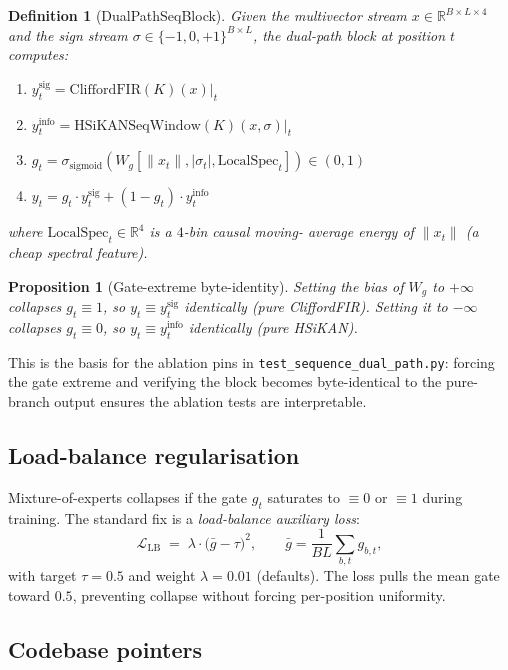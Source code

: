 \documentclass[11pt,a4paper]{article}
\newtheorem{definition}[theorem]{Definition}
\newtheorem{proposition}[theorem]{Proposition}
\theoremstyle{remark}
\newcommand{\R}{\mathbb{R}}
\begin{document}
\begin{definition}[DualPathSeqBlock]
Given the multivector stream $x \in \R^{B \times L \times 4}$ and
the sign stream $\sigma \in \{-1, 0, +1\}^{B \times L}$, the
dual-path block at position $t$ computes:
\begin{enumerate}[label=(\arabic*)]
\item $y_t^{\text{sig}} = \mathrm{CliffordFIR}(K)(x)|_t$
\item $y_t^{\text{info}} = \mathrm{HSiKANSeqWindow}(K)(x, \sigma)|_t$
\item $g_t = \sigma_{\text{sigmoid}}\!\left(W_g [\|x_t\|, |\sigma_t|, \text{LocalSpec}_t]\right) \in (0, 1)$
\item $y_t = g_t \cdot y_t^{\text{sig}} + (1 - g_t) \cdot y_t^{\text{info}}$
\end{enumerate}
where $\mathrm{LocalSpec}_t \in \R^4$ is a $4$-bin causal moving-
average energy of $\|x_t\|$ (a cheap spectral feature).
\end{definition}

\begin{proposition}[Gate-extreme byte-identity]
Setting the bias of $W_g$ to $+\infty$ collapses $g_t \equiv 1$,
so $y_t \equiv y_t^{\text{sig}}$ identically (pure CliffordFIR).
Setting it to $-\infty$ collapses $g_t \equiv 0$, so
$y_t \equiv y_t^{\text{info}}$ identically (pure HSiKAN).
\end{proposition}

This is the basis for the ablation pins in
\texttt{test\_sequence\_dual\_path.py}: forcing the gate extreme
and verifying the block becomes byte-identical to the pure-branch
output ensures the ablation tests are interpretable.

\subsection{Load-balance regularisation}

Mixture-of-experts collapses if the gate $g_t$ saturates to
$\equiv 0$ or $\equiv 1$ during training. The standard fix is a
\emph{load-balance auxiliary loss}:
\[
  \mathcal{L}_{\text{LB}} \;=\; \lambda \cdot \bigl( \bar g - \tau \bigr)^2,
  \qquad \bar g = \frac{1}{BL}\sum_{b, t} g_{b, t},
\]
with target $\tau = 0.5$ and weight $\lambda = 0.01$ (defaults).
The loss pulls the mean gate toward $0.5$, preventing collapse
without forcing per-position uniformity.

\subsection{Codebase pointers}
\end{document}
